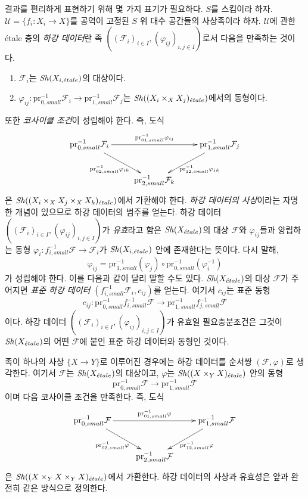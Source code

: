\medskip\noindent
결과를 편리하게 표현하기 위해 몇 가지 표기가 필요하다.
$S$를 스킴이라 하자.
$\mathcal{U} = \{f_i : X_i \to X\}$를 공역이 고정된
$S$ 위 대수 공간들의 사상족이라 하자.
$\mathcal{U}$에 관한 \'etale 층의 {\it 하강 데이터}란
족 $((\mathcal{F}_i)_{i \in I}, (\varphi_{ij})_{i, j \in I})$로서
다음을 만족하는 것이다.
\begin{enumerate}
\item $\mathcal{F}_i$는 $\mathop{\mathit{Sh}}\nolimits(X_{i, {\acute{e}tale}})$의 대상이다.
\item $\varphi_{ij} :
\text{pr}_{0, small}^{-1} \mathcal{F}_i
\longrightarrow
\text{pr}_{1, small}^{-1} \mathcal{F}_j$는
$\mathop{\mathit{Sh}}\nolimits((X_i \times_X X_j)_{\acute{e}tale})$에서의 동형이다.
\end{enumerate}
또한 {\it 코사이클 조건}이 성립해야 한다. 즉, 도식
$$
\xymatrix{
\text{pr}_{0, small}^{-1}\mathcal{F}_i
\ar[dr]_{\text{pr}_{02, small}^{-1}\varphi_{ik}}
\ar[rr]^{\text{pr}_{01, small}^{-1}\varphi_{ij}} & &
\text{pr}_{1, small}^{-1}\mathcal{F}_j
\ar[dl]^{\text{pr}_{12, small}^{-1}\varphi_{jk}} \\
& \text{pr}_{2, small}^{-1}\mathcal{F}_k
}
$$
은 $\mathop{\mathit{Sh}}\nolimits((X_i \times_X X_j \times_X X_k)_{\acute{e}tale})$에서 가환해야 한다.
{\it 하강 데이터의 사상}이라는 자명한 개념이 있으므로
하강 데이터의 범주를 얻는다.
하강 데이터
$((\mathcal{F}_i)_{i \in I}, (\varphi_{ij})_{i, j \in I})$가
{\it 유효}라고 함은 $\mathop{\mathit{Sh}}\nolimits(X_{\acute{e}tale})$의 대상 $\mathcal{F}$와
$\varphi_{ij}$들과 양립하는 동형
$\varphi_i : f_{i, small}^{-1} \mathcal{F} \to \mathcal{F}_i$가
$\mathop{\mathit{Sh}}\nolimits(X_{i, {\acute{e}tale}})$ 안에 존재한다는 뜻이다. 다시 말해,
$$
\varphi_{ij} =
\text{pr}_{1, small}^{-1} (\varphi_j) \circ
\text{pr}_{0, small}^{-1} (\varphi_i^{-1})
$$
가 성립해야 한다. 이를 다음과 같이 달리 말할 수도 있다.
$\mathop{\mathit{Sh}}\nolimits(X_{\acute{e}tale})$의 대상 $\mathcal{F}$가 주어지면
{\it 표준 하강 데이터}
$(f_{i, small}^{-1}\mathcal{F}_i, c_{ij})$를 얻는다. 여기서 $c_{ij}$는
표준 동형
$$
c_{ij} : \text{pr}_{0, small}^{-1} f_{i, small}^{-1}\mathcal{F}
\longrightarrow
\text{pr}_{1, small}^{-1} f_{j, small}^{-1}\mathcal{F}
$$
이다. 하강 데이터
$((\mathcal{F}_i)_{i \in I}, (\varphi_{ij})_{i, j \in I})$가
유효일 필요충분조건은 그것이 $\mathop{\mathit{Sh}}\nolimits(X_{\acute{e}tale})$의 어떤
$\mathcal{F}$에 붙인 표준 하강 데이터와 동형인 것이다.

\medskip\noindent
족이 하나의 사상 $\{X \to Y\}$로 이루어진 경우에는
하강 데이터를 순서쌍 $(\mathcal{F}, \varphi)$로 생각한다.
여기서 $\mathcal{F}$는 $\mathop{\mathit{Sh}}\nolimits(X_{\acute{e}tale})$의 대상이고,
$\varphi$는 $\mathop{\mathit{Sh}}\nolimits((X \times_Y X)_{\acute{e}tale})$ 안의 동형
$$
\text{pr}_{0, small}^{-1} \mathcal{F}
\longrightarrow
\text{pr}_{1, small}^{-1} \mathcal{F}
$$
이며 다음 코사이클 조건을 만족한다. 즉, 도식
$$
\xymatrix{
\text{pr}_{0, small}^{-1}\mathcal{F}
\ar[dr]_{\text{pr}_{02, small}^{-1}\varphi}
\ar[rr]^{\text{pr}_{01, small}^{-1}\varphi} & &
\text{pr}_{1, small}^{-1}\mathcal{F}
\ar[dl]^{\text{pr}_{12, small}^{-1}\varphi} \\
& \text{pr}_{2, small}^{-1}\mathcal{F}
}
$$
은 $\mathop{\mathit{Sh}}\nolimits((X \times_Y X \times_Y X)_{\acute{e}tale})$에서 가환한다.
하강 데이터의 사상과 유효성은 앞과 완전히 같은 방식으로 정의한다.

